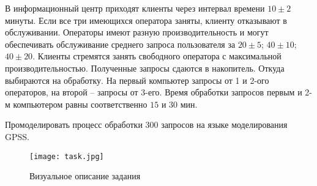 В информационный центр приходят клиенты через интервал времени $10\pm2$ минуты. Если все три имеющихся оператора заняты, клиенту отказывают в обслуживании. Операторы имеют разную производительность и могут обеспечивать обслуживание среднего запроса пользователя за $20\pm5$; $40\pm10$; $40\pm20$. Клиенты стремятся занять свободного оператора с максимальной производительностью. Полученные запросы сдаются в накопитель. Откуда выбираются на обработку. На первый компьютер запросы от 1 и 2-ого операторов, на второй – запросы от 3-его. Время обработки запросов первым и 2-м компьютером равны соответственно $15$ и $30$ мин.

Промоделировать процесс обработки 300 запросов на языке моделирования GPSS.

\begin{figure}[h]
	\begin{center}
		{\texttt{[image: task.jpg]}
			\caption{Визуальное описание задания}
			\label{pic:1}}
	\end{center}
\end{figure}